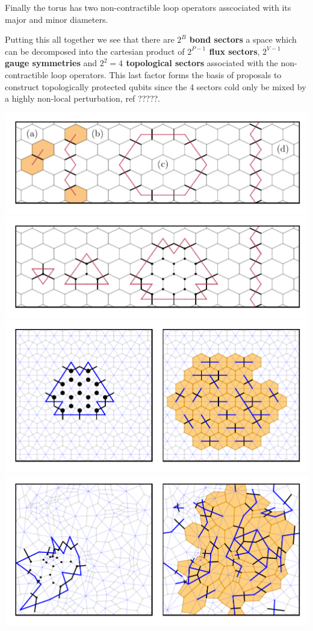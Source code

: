 Finally the torus has two non-contractible loop operators asscociated
with its major and minor diameters.

Putting this all together we see that there are \textbf{\(2^B\) bond
sectors} a space which can be decomposed into the cartesian product of
\textbf{\(2^{P-1}\) flux sectors}, \textbf{\(2^{V-1}\) gauge symmetries}
and \textbf{\(2^2 = 4\) topological sectors} associated with the
non-contractible loop operators. This last factor forms the basis of
proposals to construct topologically protected qubits since the 4
sectors cold only be mixed by a highly non-local perturbation, ref
?????.

\includegraphics{figure_code/amk_chapter/intro/types_of_dual_loops/types_of_dual_loops.pdf}
\includegraphics{figure_code/amk_chapter/intro/gauge_symmetries/gauge_symmetries.pdf}
\includegraphics{figure_code/amk_chapter/flood_fill/flood_fill.pdf}
\includegraphics{figure_code/amk_chapter/flood_fill_amorphous/flood_fill_amorphous.pdf}

